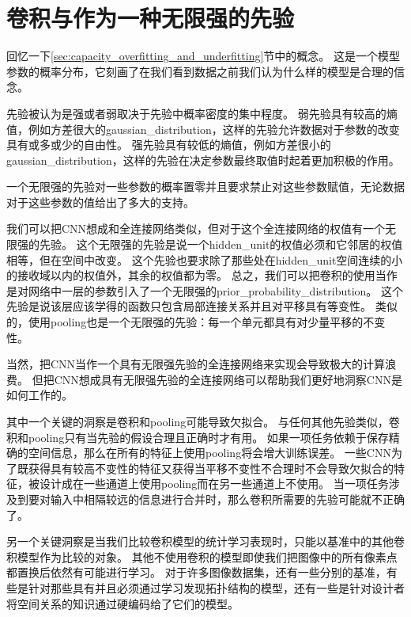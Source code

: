\section{卷积与作为一种无限强的先验}
\label{sec:convolution_and_pooling_as_an_infinitely_strong_prior}

回忆一下\ref{sec:capacity_overfitting_and_underfitting}节中的概念。
这是一个模型参数的概率分布，它刻画了在我们看到数据之前我们认为什么样的模型是合理的信念。

 
先验被认为是强或者弱取决于先验中概率密度的集中程度。
弱先验具有较高的熵值，例如方差很大的\gls{gaussian_distribution}，这样的先验允许数据对于参数的改变具有或多或少的自由性。
强先验具有较低的熵值，例如方差很小的\gls{gaussian_distribution}，这样的先验在决定参数最终取值时起着更加积极的作用。

一个无限强的先验对一些参数的概率置零并且要求禁止对这些参数赋值，无论数据对于这些参数的值给出了多大的支持。

我们可以把\gls{CNN}想成和全连接网络类似，但对于这个全连接网络的权值有一个无限强的先验。
这个无限强的先验是说一个\gls{hidden_unit}的权值必须和它邻居的权值相等，但在空间中改变。
这个先验也要求除了那些处在\gls{hidden_unit}空间连续的小的接收域以内的权值外，其余的权值都为零。%
总之，我们可以把卷积的使用当作是对网络中一层的参数引入了一个无限强的\gls{prior_probability_distribution}。
这个先验是说该层应该学得的函数只包含局部连接关系并且对平移具有等变性。
类似的，使用\gls{pooling}也是一个无限强的先验：每一个单元都具有对少量平移的不变性。

当然，把\gls{CNN}当作一个具有无限强先验的全连接网络来实现会导致极大的计算浪费。
但把\gls{CNN}想成具有无限强先验的全连接网络可以帮助我们更好地洞察\gls{CNN}是如何工作的。

其中一个关键的洞察是卷积和\gls{pooling}可能导致欠拟合。
与任何其他先验类似，卷积和\gls{pooling}只有当先验的假设合理且正确时才有用。
如果一项任务依赖于保存精确的空间信息，那么在所有的特征上使用\gls{pooling}将会增大训练误差。
一些\gls{CNN}\citep{Szegedy-et-al-arxiv2014}为了既获得具有较高不变性的特征又获得当平移不变性不合理时不会导致欠拟合的特征，被设计成在一些通道上使用\gls{pooling}而在另一些通道上不使用。
当一项任务涉及到要对输入中相隔较远的信息进行合并时，那么卷积所需要的先验可能就不正确了。

另一个关键洞察是当我们比较卷积模型的统计学习表现时，只能以基准中的其他卷积模型作为比较的对象。
其他不使用卷积的模型即使我们把图像中的所有像素点都置换后依然有可能进行学习。
对于许多图像数据集，还有一些分别的基准，有些是针对那些具有并且必须通过学习发现拓扑结构的模型，还有一些是针对设计者将空间关系的知识通过硬编码给了它们的模型。

